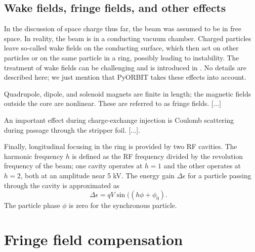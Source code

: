 \subsection{Wake fields, fringe fields, and other effects}

In the discussion of space charge thus far, the beam was assumed to be in free space. In reality, the beam is in a conducting vacuum chamber. Charged particles leave so-called wake fields on the conducting surface, which then act on other particles or on the same particle in a ring, possibly leading to instability. The treatment of wake fields can be challenging and is introduced in \cite{Chao1993}. No details are described here; we just mention that PyORBIT takes these effects into account.

Quadrupole, dipole, and solenoid magnets are finite in length; the magnetic fields outside the core are nonlinear. These are referred to as fringe fields. [...]

An important effect during charge-exchange injection is Coulomb scattering during passage through the stripper foil. [...].

Finally, longitudinal focusing in the ring is provided by two RF cavities. The harmonic frequency $h$ is defined as the RF frequency divided by the revolution frequency of the beam; one cavity operates at $h = 1$ and the other operates at $h = 2$, both at an amplitude near 5 kV. The energy gain $\Delta \epsilon$ for a particle passing through the cavity is approximated as  
%
\begin{equation}
    \Delta \epsilon = q V \sin((h \phi + \phi_0).
\end{equation}
%
The particle phase $\phi$ is zero for the synchronous particle.



\section{Fringe field compensation}

